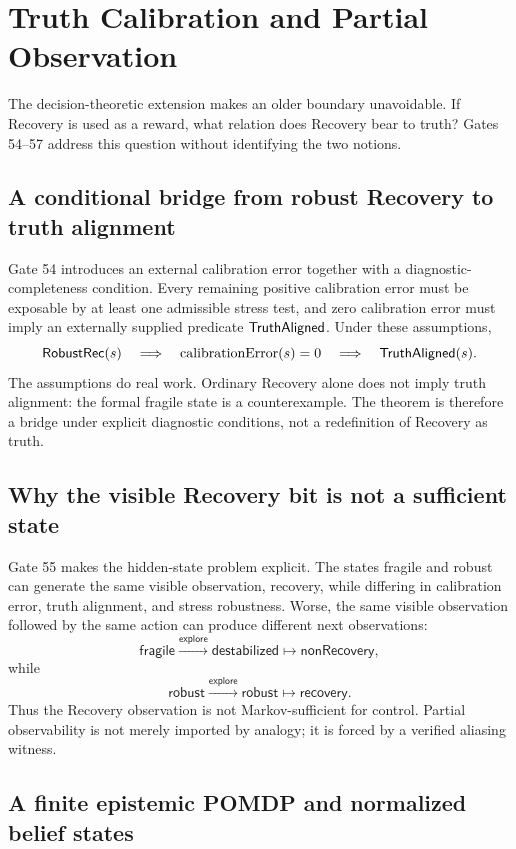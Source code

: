 \section{Truth Calibration and Partial Observation}

The decision-theoretic extension makes an older boundary unavoidable. If Recovery is used as a reward, what relation does Recovery bear to truth? Gates 54--57 address this question without identifying the two notions.

\subsection{A conditional bridge from robust Recovery to truth alignment}

Gate 54 introduces an external calibration error together with a diagnostic-completeness condition. Every remaining positive calibration error must be exposable by at least one admissible stress test, and zero calibration error must imply an externally supplied predicate $\mathsf{TruthAligned}$. Under these assumptions,
\[
\mathsf{RobustRec}(s)
\quad\Longrightarrow\quad
\operatorname{calibrationError}(s)=0
\quad\Longrightarrow\quad
\mathsf{TruthAligned}(s).
\]
The assumptions do real work. Ordinary Recovery alone does not imply truth alignment: the formal \textsf{fragile} state is a counterexample. The theorem is therefore a bridge under explicit diagnostic conditions, not a redefinition of Recovery as truth.

\subsection{Why the visible Recovery bit is not a sufficient state}

Gate 55 makes the hidden-state problem explicit. The states \textsf{fragile} and \textsf{robust} can generate the same visible observation, \textsf{recovery}, while differing in calibration error, truth alignment, and stress robustness. Worse, the same visible observation followed by the same action can produce different next observations:
\[
\textsf{fragile}\xrightarrow{\textsf{explore}}\textsf{destabilized}\mapsto\textsf{nonRecovery},
\]
while
\[
\textsf{robust}\xrightarrow{\textsf{explore}}\textsf{robust}\mapsto\textsf{recovery}.
\]
Thus the Recovery observation is not Markov-sufficient for control. Partial observability is not merely imported by analogy; it is forced by a verified aliasing witness.

\subsection{A finite epistemic POMDP and normalized belief states}

